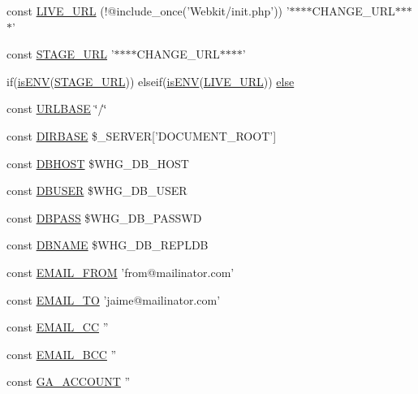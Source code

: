 \begin{DoxyCompactItemize}
\item 
const \hyperlink{global_8php_aa55bd7b507e10bb441ac76d99b4c1358}{L\-I\-V\-E\-\_\-\-U\-R\-L} (!@include\-\_\-once('Webkit/init.\-php')) '$\ast$$\ast$$\ast$$\ast$C\-H\-A\-N\-G\-E\-\_\-\-U\-R\-L$\ast$$\ast$$\ast$$\ast$'
\item 
const \hyperlink{global_8php_a9de38c82260effe90ef1caa4d6026973}{S\-T\-A\-G\-E\-\_\-\-U\-R\-L} '$\ast$$\ast$$\ast$$\ast$C\-H\-A\-N\-G\-E\-\_\-\-U\-R\-L$\ast$$\ast$$\ast$$\ast$'
\item 
if(\hyperlink{global_8php_aa708b5658547eba853300c5c0f5b97b9}{is\-E\-N\-V}(\hyperlink{global_8php_a9de38c82260effe90ef1caa4d6026973}{S\-T\-A\-G\-E\-\_\-\-U\-R\-L})) elseif(\hyperlink{global_8php_aa708b5658547eba853300c5c0f5b97b9}{is\-E\-N\-V}(\hyperlink{global_8php_aa55bd7b507e10bb441ac76d99b4c1358}{L\-I\-V\-E\-\_\-\-U\-R\-L})) \hyperlink{global_8php_a84d6f541e8b918d4d74fe5a02b30588e}{else}
\item 
const \hyperlink{global_8php_a422353d788747ecd47fc7a656e4ebd92}{U\-R\-L\-B\-A\-S\-E} \char`\"{}/\char`\"{}
\item 
const \hyperlink{global_8php_a504552fd43e46a0032aa3f2895349f22}{D\-I\-R\-B\-A\-S\-E} \$\-\_\-\-S\-E\-R\-V\-E\-R\mbox{[}'D\-O\-C\-U\-M\-E\-N\-T\-\_\-\-R\-O\-O\-T'\mbox{]}
\item 
const \hyperlink{global_8php_a40edb9274f7711736cc3ee12d2e5ddba}{D\-B\-H\-O\-S\-T} \$W\-H\-G\-\_\-\-D\-B\-\_\-\-H\-O\-S\-T
\item 
const \hyperlink{global_8php_a221f39b0b526c043e3a1ade2dd56a70e}{D\-B\-U\-S\-E\-R} \$W\-H\-G\-\_\-\-D\-B\-\_\-\-U\-S\-E\-R
\item 
const \hyperlink{global_8php_add7bef9fbed1ad1fa386dcb65fd5d813}{D\-B\-P\-A\-S\-S} \$W\-H\-G\-\_\-\-D\-B\-\_\-\-P\-A\-S\-S\-W\-D
\item 
const \hyperlink{global_8php_af7d219badcc93cc3a13a604c769542bc}{D\-B\-N\-A\-M\-E} \$W\-H\-G\-\_\-\-D\-B\-\_\-\-R\-E\-P\-L\-D\-B
\item 
const \hyperlink{global_8php_af97c5ff33b4f726b36d6db60e5b757eb}{E\-M\-A\-I\-L\-\_\-\-F\-R\-O\-M} 'from@mailinator.\-com'
\item 
const \hyperlink{global_8php_adf9a2b18bea582e3d0ca5892d2c274fc}{E\-M\-A\-I\-L\-\_\-\-T\-O} 'jaime@mailinator.\-com'
\item 
const \hyperlink{global_8php_a437cf4a502c60e7174f5d5a97a8b0fb4}{E\-M\-A\-I\-L\-\_\-\-C\-C} ''
\item 
const \hyperlink{global_8php_ae82459bfcf33ac1be174bfe1237a545d}{E\-M\-A\-I\-L\-\_\-\-B\-C\-C} ''
\item 
const \hyperlink{global_8php_a63584e945f652ffb7392f41c4f013922}{G\-A\-\_\-\-A\-C\-C\-O\-U\-N\-T} ''
\end{DoxyCompactItemize}


